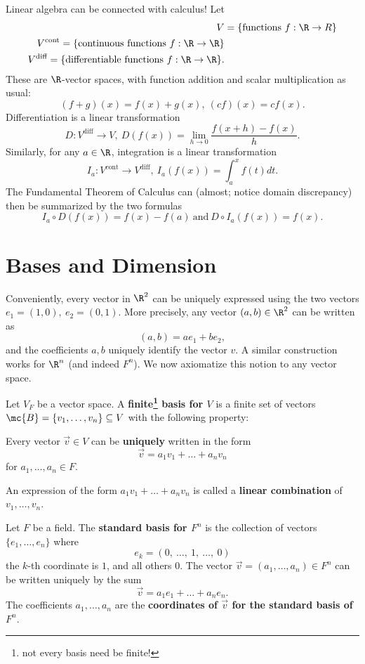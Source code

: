 \documentclass[math1530-lecture-notes]{subfiles}
\begin{document}
\begin{example}
  Linear algebra can be connected with calculus! Let
  \begin{align*}
    V &= \{\text{functions}~f:\R\to R \} \\
    V^{\text{cont}}=\{ \text{continuous functions}~ f:\R\to \R \}\\
    V^{\text{diff}}=\{ \text{differentiable functions}~ f:\R\to \R \}
  .\end{align*} These are $\R$-vector spaces, with function addition and scalar multiplication as
  usual: \[
    (f+g)(x)=f(x)+g(x),\ (cf)(x)=cf(x)
  .\] Differentiation is a linear transformation \[
  D: V^{\text{diff}}\longrightarrow V,\ D(f(x))=\lim\limits_{h \to 0} \frac{f(x+h)-f(x)}{h}
  .\] Similarly, for any $a\in \R$, integration is a linear transformation \[
    I_a:V^{\text{cont}}\longrightarrow V^{\text{diff}},\ I_a(f(x))=\int_a^x f(t)dt
  .\] The Fundamental Theorem of Calculus can (almost; notice domain discrepancy) then be summarized
  by the two formulas \[
    I_a\circ D(f(x))=f(x)-f(a) ~\text{and}~ D\circ I_a(f(x))=f(x)
  .\] 
\end{example}

\section{Bases and Dimension}
Conveniently, every vector in $\R^2$ can be uniquely expressed using the two vectors $e_1=(1,0),\
e_2=(0,1)$. More precisely, any vector $(a,b)\in \R^2$ can be written as \[
  (a,b)=ae_1+be_2
,\] and the coefficients $a,b$ uniquely identify the vector $v$. A similar construction works for
$\R^n$ (and indeed $F^n$). We now axiomatize this notion to any vector space.

\begin{definition}[Bases]{}
  Let $V_F$ be a vector space. A \textbf{finite\footnote{not every basis need be finite!} basis for
  $V$} is a finite set of vectors $\mc{B}=\{ v_1,\ldots,v_n \}\subseteq V$ with the following
  property: 
  \begin{center}
    Every vector $\vec{v}\in V$ can be \textbf{uniquely} written in the form \[
      \vec{v}=a_1v_1+\ldots+a_nv_n
    \] for $a_1,\ldots,a_n\in F$.
  \end{center}
  An expression of the form $a_1v_1+\ldots+a_nv_n$ is called a \textbf{linear combination} of
  $v_1,\ldots,v_n$.
\end{definition}
\begin{example}
  Let $F$ be a field. The \textbf{standard basis for $F^n$} is the collection of vectors $\{
  e_1,\ldots,e_n \}$ where \[
    e_k=(0,\ \ldots,\ 1,\ \ldots,\ 0)
  \] the $k$-th coordinate is $1$, and all others $0$. The vector $\vec{v}=(a_1,\ldots,a_n)\in F^n$
  can be written uniquely by the sum \[
    \vec{v}=a_1e_1+\ldots+a_ne_n
  .\] The coefficients $a_1,\ldots,a_n$ are the \textbf{coordinates of $\vec{v}$ for the standard
  basis of $F^n$}.
\end{example}
\end{document}
